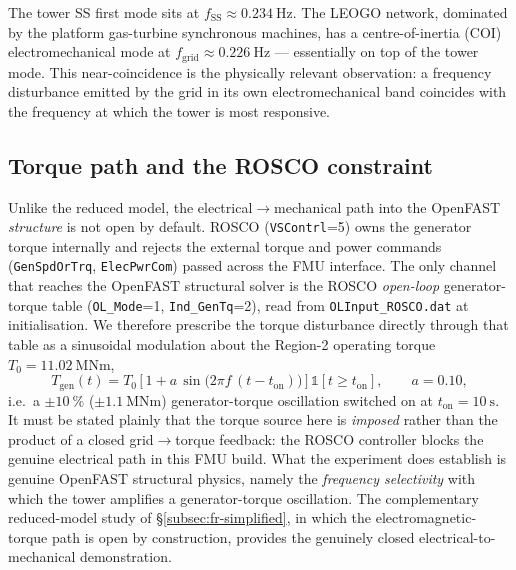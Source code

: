 The tower SS first mode sits at \(f_{\mathrm{SS}} \approx \SI{0.234}{\hertz}\).
The LEOGO network, dominated by the platform gas-turbine synchronous machines,
has a centre-of-inertia (COI) electromechanical mode at
\(f_{\mathrm{grid}} \approx \SI{0.226}{\hertz}\) --- essentially on top of the
tower mode. This near-coincidence is the physically relevant observation: a
frequency disturbance emitted by the grid in its own electromechanical band
coincides with the frequency at which the tower is most responsive.

\subsection{Torque path and the ROSCO constraint}
\label{subsec:ss-torque-path}

Unlike the reduced model, the electrical\(\to\)mechanical path into the OpenFAST
\emph{structure} is not open by default. ROSCO (\texttt{VSContrl}=5) owns the
generator torque internally and rejects the external torque and power commands
(\texttt{GenSpdOrTrq}, \texttt{ElecPwrCom}) passed across the FMU interface. The
only channel that reaches the OpenFAST structural solver is the ROSCO
\emph{open-loop} generator-torque table (\texttt{OL\_Mode}=1,
\texttt{Ind\_GenTq}=2), read from \texttt{OLInput\_ROSCO.dat} at initialisation.
We therefore prescribe the torque disturbance directly through that table as a
sinusoidal modulation about the Region-2 operating torque
\(T_0 = \SI{11.02}{\mega\newton\metre}\),
\begin{equation}
  T_{\mathrm{gen}}(t) = T_0\,\big[\,1 + a\,
    \sin\!\big(2\pi f\,(t-t_{\mathrm{on}})\big)\,\big]\,
    \mathbb{1}[t \ge t_{\mathrm{on}}],
  \qquad a = 0.10,
  \label{eq:ss-forcing}
\end{equation}
i.e.\ a \(\pm\SI{10}{\percent}\) (\(\pm\SI{1.1}{\mega\newton\metre}\)) generator-torque
oscillation switched on at \(t_{\mathrm{on}}=\SI{10}{\second}\). It must be
stated plainly that the torque source here is \emph{imposed} rather than the
product of a closed grid\(\to\)torque feedback: the ROSCO controller blocks the
genuine electrical path in this FMU build. What the experiment does establish is
genuine OpenFAST structural physics, namely the \emph{frequency selectivity}
with which the tower amplifies a generator-torque oscillation. The
complementary reduced-model study of \S\ref{subsec:fr-simplified}, in which the
electromagnetic-torque path is open by construction, provides the genuinely
closed electrical-to-mechanical demonstration.

